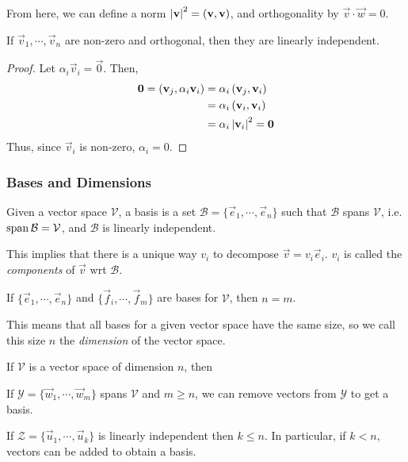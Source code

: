 \documentclass[12pt]{article}
\begin{document}
From here, we can define a norm $\left\lvert \mathbf{v} \right\rvert^{2} = (\mathbf{v},\mathbf{v})$, and
orthogonality by $\vec{v}\cdot\vec{w} = 0$.

\begin{prop}
    If $\vec{v}_1,\cdots,\vec{v}_n$ are non-zero and orthogonal,
    then they are linearly independent.
\end{prop}
\begin{proof}
    Let $\alpha_i \vec{v}_i = \vec{0}$. Then,
    \begin{align*}
        \mathbf{0} = \left( \mathbf{v}_j , \alpha_i \mathbf{v}_i \right)
        &= \alpha_i\left( \mathbf{v}_j , \mathbf{v}_i \right)\\
        &= \alpha_i\left( \mathbf{v}_i , \mathbf{v}_i \right)\\
        &= \alpha_i\left\lvert \mathbf{v}_i \right\rvert^{2} = \mathbf{0}
    \end{align*}
    Thus, since $\vec{v}_i$ is non-zero, $\alpha_i = 0$.
\end{proof}

\subsubsection{Bases and Dimensions}

Given a vector space $\mathcal{V}$, a basis is a set 
$\mathcal{B} = \{\vec{e}_1,\cdots,\vec{e}_n\}$
such that $\mathcal{B}$ spans $\mathcal{V}$, i.e. $\operatorname{span} \mathcal{B} = \mathcal{V}$,
and $\mathcal{B}$ is linearly independent.

This implies that there is a unique way $v_i$
to decompose $\vec{v} = v_i \vec{e}_i$.
$v_i$ is called the \emph{components} of $\vec{v}$ wrt $\mathcal{B}$.

\begin{theorem}
    If $\{\vec{e}_1,\cdots,\vec{e}_n\}$ and $\{\vec{f}_i,\cdots,\vec{f}_m\}$
    are bases for $\mathcal{V}$, then $n=m$.
\end{theorem}

This means that all bases for a given vector space
have the same size, so we call this size $n$ the \emph{dimension} of the vector space.

\begin{prop}
    If $\mathcal{V}$ is a vector space of dimension $n$, then
    \begin{compactenum}[(i)]
    \item If $\mathcal{Y} = \{\vec{w}_1,\cdots,\vec{w}_m\}$ spans $\mathcal{V}$ and $m \ge n$,
        we can remove vectors from $\mathcal{Y}$ to get a basis.
    \item If $\mathcal{Z} = \{\vec{u}_1,\cdots,\vec{u}_k\}$ is linearly independent
        then $k \le n$. In particular, if $k < n$,
        vectors can be added to obtain a basis.
    \end{compactenum}
\end{prop}
\end{document}
